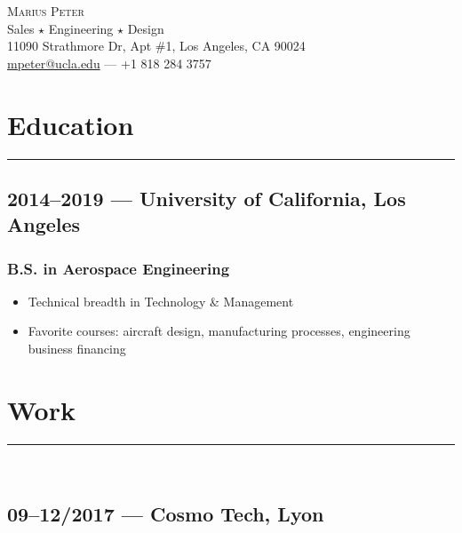 \documentclass[10pt]{report}
\begin{document}
\centering
\huge \textsc{Marius Peter}\\[0.2cm]
\Large Sales $\star$ Engineering $\star$ Design\\[0.2cm]

\normalsize
11090 Strathmore Dr, Apt \#1,
Los Angeles, CA 90024\\
\href{mailto:mpeter@ucla.edu}{mpeter@ucla.edu} --- +1 818 284 3757\\


\section*{Education}
\rule{\linewidth}{1pt}
\subsection*{2014--2019 --- University of California, Los Angeles}
\subsubsection*{B.S. in Aerospace Engineering}
\begin{itemize}
    \item Technical breadth in Technology \& Management
    \item Favorite courses: aircraft design, manufacturing processes, engineering business financing
\end{itemize}

\section*{Work}
\rule{\linewidth}{1pt}\\
\subsection*{09--12/2017 --- Cosmo Tech, Lyon}
\end{document}
